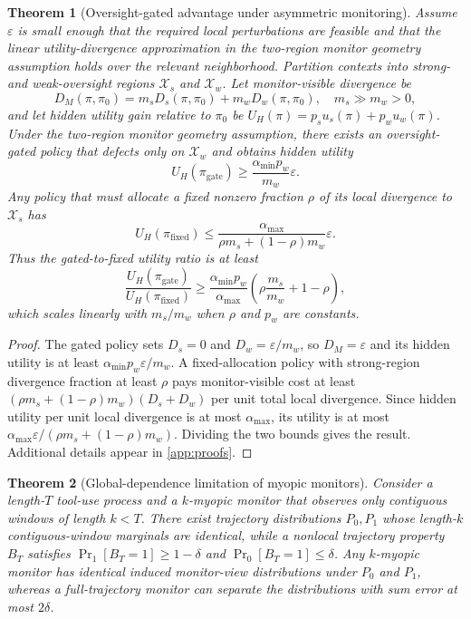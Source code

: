\documentclass{article}
\newtheorem{theorem}{Theorem}
\newcommand{\X}{\mathcal{X}}
\begin{document}
\begin{theorem}[Oversight-gated advantage under asymmetric monitoring]\label{thm:gated_advantage}
Assume $\varepsilon$ is small enough that the required local perturbations are feasible and that the linear utility-divergence approximation in the two-region monitor geometry assumption holds over the relevant neighborhood.
Partition contexts into strong- and weak-oversight regions $\X_s$ and $\X_w$. Let monitor-visible divergence be
\begin{equation}
D_M(\pi,\pi_0)=m_s D_s(\pi,\pi_0)+m_w D_w(\pi,\pi_0),\quad m_s\gg m_w>0,
\end{equation}
and let hidden utility gain relative to $\pi_0$ be $U_H(\pi)=p_su_s(\pi)+p_wu_w(\pi)$. Under the two-region monitor geometry assumption, there exists an oversight-gated policy that defects only on $\X_w$ and obtains hidden utility
\begin{equation}
U_H(\pi_{\mathrm{gate}})\ge \frac{\alpha_{\min}p_w}{m_w}\varepsilon.
\end{equation}
Any policy that must allocate a fixed nonzero fraction $\rho$ of its local divergence to $\X_s$ has
\begin{equation}
U_H(\pi_{\mathrm{fixed}})\le \frac{\alpha_{\max}}{\rho m_s+(1-\rho)m_w}\varepsilon.
\end{equation}
Thus the gated-to-fixed utility ratio is at least
\begin{equation}
\frac{U_H(\pi_{\mathrm{gate}})}{U_H(\pi_{\mathrm{fixed}})}
\ge
\frac{\alpha_{\min}p_w}{\alpha_{\max}}
\left(\rho\frac{m_s}{m_w}+1-\rho\right),
\end{equation}
which scales linearly with $m_s/m_w$ when $\rho$ and $p_w$ are constants.
\end{theorem}

\begin{proof}
The gated policy sets $D_s=0$ and $D_w=\varepsilon/m_w$, so $D_M=\varepsilon$ and its hidden utility is at least $\alpha_{\min}p_w\varepsilon/m_w$. A fixed-allocation policy with strong-region divergence fraction at least $\rho$ pays monitor-visible cost at least $(\rho m_s+(1-\rho)m_w)(D_s+D_w)$ per unit total local divergence. Since hidden utility per unit local divergence is at most $\alpha_{\max}$, its utility is at most $\alpha_{\max}\varepsilon/(\rho m_s+(1-\rho)m_w)$. Dividing the two bounds gives the result. Additional details appear in \cref{app:proofs}.
\end{proof}

\begin{theorem}[Global-dependence limitation of myopic monitors]\label{thm:myopic_monitors}
Consider a length-$T$ tool-use process and a $k$-myopic monitor that observes only contiguous windows of length $k<T$. There exist trajectory distributions $P_0,P_1$ whose length-$k$ contiguous-window marginals are identical, while a nonlocal trajectory property $B_T$ satisfies $\Pr_{1}[B_T=1]\ge 1-\delta$ and $\Pr_{0}[B_T=1]\le \delta$. Any $k$-myopic monitor has identical induced monitor-view distributions under $P_0$ and $P_1$, whereas a full-trajectory monitor can separate the distributions with sum error at most $2\delta$.
\end{theorem}
\end{document}
